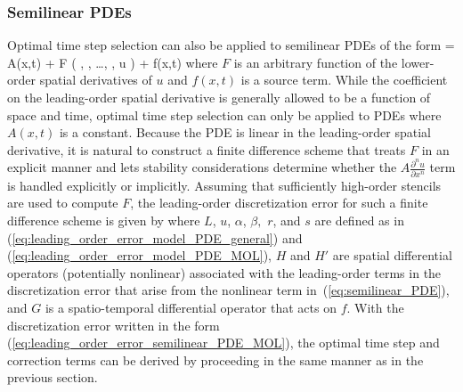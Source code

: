 \documentclass[fleqn,12pt,twoside]{article}
\begin{document}
\subsubsection*{Semilinear PDEs}
Optimal time step selection can also be applied to semilinear PDEs of the
form
\beq
   = A(x,t) 
  + F \left( ,
      , \ldots,
      , u \right)
  + f(x,t)
  \label{eq:semilinear_PDE}
\eeq
where $F$ is an arbitrary function of the lower-order spatial derivatives
of $u$ and $f(x,t)$ is a source term.  While the coefficient on the 
leading-order spatial derivative is generally allowed to be a function of 
space and time, optimal time step selection can only be applied to PDEs where
$A(x,t)$ is a constant.  Because the PDE is linear in the leading-order 
spatial derivative, it is natural to construct a finite difference scheme that 
treats $F$ in an explicit manner and lets stability considerations determine 
whether the $A \frac{\partial^n u}{\partial x^n}$ term is handled explicitly 
or implicitly.  Assuming that sufficiently high-order stencils are used to 
compute $F$, the leading-order discretization error for such a finite 
difference scheme is given by
\beq
  \dt {}
  \label{eq:leading_order_error_semilinear_PDE_MOL}
\eeq
where $L$, $u$, $\alpha$, $\beta,$ $r$, and $s$ are defined as in
(\ref{eq:leading_order_error_model_PDE_general}) and
(\ref{eq:leading_order_error_model_PDE_MOL}), $H$ and $H'$ are spatial 
differential operators (potentially nonlinear) associated with the 
leading-order terms in the discretization error that arise from the nonlinear 
term in~(\ref{eq:semilinear_PDE}), and $G$ is a spatio-temporal differential 
operator that acts on $f$.  With the discretization error written in the 
form (\ref{eq:leading_order_error_semilinear_PDE_MOL}), the optimal time 
step and correction terms can be derived by proceeding in the same manner 
as in the previous section.
\end{document}
